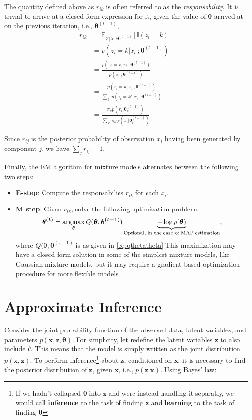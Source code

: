 The quantity defined above as $r_{ik}$ is often referred to as the \emph{responsability}. It
is trivial to arrive at a closed-form expression for it, given the value of $\bm{\theta}$
arrived at on the previous iteration, i.e., $\bm{\theta}^{(t-1)}$,
\begin{align}
r_{ik} &= \mathbb{E}_{Z|X, \bm{\theta}^{(t-1)}}[\mathbb{I}(z_i = k)] \\
    &= p(z_i = k | x_i\ ; \bm{\theta}^{(t-1)}) \\
    &= \frac{p(z_i = k , x_i\ ; \bm{\theta}^{(t-1)})}{p(x_i\ ; \bm{\theta}^{(t-1)})} \\
    &= \frac{p(z_i = k , x_i\ ; \bm{\theta}^{(t-1)})}{\sum_{k'} p(z_i = k' , x_i\ ; \bm{\theta}^{(t-1)})} \\
    &= \frac{\pi_k p(x_i | \bm{\theta}_k^{(t-1)})}{\sum_{k'} \pi_{k'} p(x_i | \bm{\theta}_{k'}^{(t-1)})}
\end{align}

Since $r_{ij}$ is the posterior probability of observation $x_i$ having been
generated by component $j$, we have $\sum_j r_{ij} = 1$.

Finally, the EM algorithm for mixture models alternates between the following two steps:
\begin{itemize}
    \item \textbf{E-step}: Compute the responsabilies $r_{ik}$ for each $x_i$.
    \item \textbf{M-step}: Given $r_{ik}$, solve the following optimization
        problem:
        \begin{align}
            \bm{\theta^{(t)}} = \argmax_{\bm{\theta}} Q(\bm{\theta}, \bm{\theta^{(t-1)}})
                \underbrace{+ \log p(\bm{\theta})}_\text{Optional, in the case of MAP estimation},
        \end{align} where $Q(\bm{\theta}, \bm{\theta^{(t-1)}}$ is as given in \ref{eq:qthetatheta}
        This maximization may have a closed-form solution in some of the simplest
        mixture models, like Gaussian mixture models, but it may require a gradient-based
        optimization procedure for more flexible models.
\end{itemize}

\section{Approximate Inference}
\label{section:probmodelinf}
Consider the joint probability function of the observed data, latent variables,
and parameters $p(\bm{x}, \bm{z}, \bm{\theta})$. For simplicity, let redefine the
latent variables $\bm{z}$ to also include $\theta$. This means that the model is simply written
as the joint distribution $p(\bm{x}, \bm{z})$. To perform inference\footnote{If we
hadn't collapsed $\bm{\theta}$ into $\bm{z}$ and were instead handling it separatly,
we would call \textbf{inference} to the task of finding $\bm{z}$ and \textbf{learning}
to the task of finding $\bm{\theta}$} about $\bm{z}$, conditioned on $\bm{x}$, it
is necessary to find the posterior distribution of $\bm{z}$, given $\bm{x}$, i.e.,
$p(\bm{z}|\bm{x})$. Using Bayes' law:

